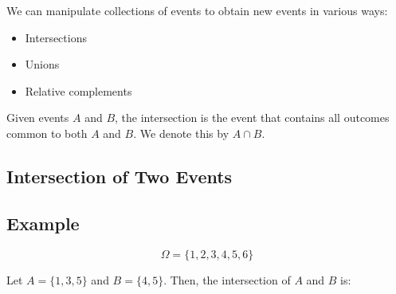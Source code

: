 \documentclass{article}
\begin{document}
\begin{center}
\end{center}

\pagebreak

We can manipulate collections of events to obtain new events in various ways:

\begin{itemize}
    \item Intersections
    \item Unions
    \item Relative complements
\end{itemize}

Given events \(A\) and \(B\), the intersection is the event that contains all outcomes common to both \(A\) and \(B\). We denote this by \(A \cap B\).

\subsection*{Intersection of Two Events}

\begin{center}
\end{center}

\subsection*{Example}

\[
\Omega = \{1, 2, 3, 4, 5, 6\}
\]

Let \(A = \{1, 3, 5\}\) and \(B = \{4, 5\}\). Then, the intersection of \(A\) and \(B\) is:
\end{document}
